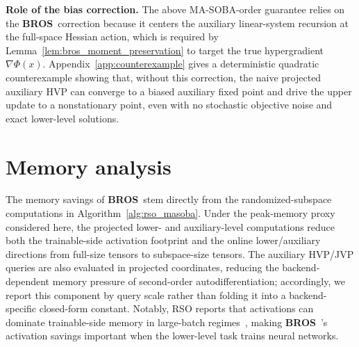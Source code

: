 \documentclass{pkumelon}
\theoremstyle{plain}
\newcommand{\oursname}{\textnormal{\textbf{BROS}}}
\newcommand{\ours}{\oursname\ }
\begin{document}
\textbf{Role of the bias correction.}
The above MA-SOBA-order guarantee relies on the \ours correction because it centers the auxiliary linear-system recursion at the full-space Hessian action, which is required by Lemma~\ref{lem:bros_moment_preservation} to target the true hypergradient $\nabla\Phi(x)$. Appendix~\ref{app:counterexample} gives a deterministic quadratic counterexample showing that, without this correction, the naive projected auxiliary HVP can converge to a biased auxiliary fixed point and drive the upper update to a nonstationary point, even with no stochastic objective noise and exact lower-level solutions.



\section{Memory analysis}
\label{sec:memory_efficiency}
The memory savings of \ours stem directly from the randomized-subspace computations in Algorithm~\ref{alg:rso_masoba}. Under the peak-memory proxy considered here, the projected lower- and auxiliary-level computations reduce both the trainable-side activation footprint and the online lower/auxiliary directions from full-size tensors to subspace-size tensors. The auxiliary HVP/JVP queries are also evaluated in projected coordinates, reducing the backend-dependent memory pressure of second-order autodifferentiation; accordingly, we report this component by query scale rather than folding it into a backend-specific closed-form constant. Notably, RSO reports that activations can dominate trainable-side memory in large-batch regimes~\citep{chen2025memory}, making \ours's activation savings important when the lower-level task trains neural networks.
\end{document}

